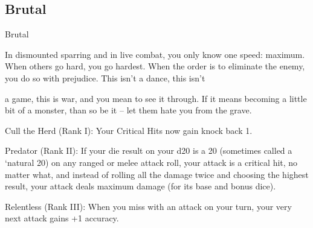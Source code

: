 \subsection{Brutal}

                                                      Brutal

In dismounted sparring and in live combat, you only know one speed: maximum. When others go hard, you
go hardest. When the order is to eliminate the enemy, you do so with prejudice. This isn’t a dance, this isn’t

a game, this is war, and you mean to see it through. If it means becoming a little bit of a monster, than so
be it -- let them hate you from the grave.




Cull the Herd (Rank I): Your Critical Hits now gain knock back 1.

Predator (Rank II): If your die result on your d20 is a 20 (sometimes called a ‘natural 20) on any
ranged or melee attack roll, your attack is a critical hit, no matter what, and instead of rolling all
the damage twice and choosing the highest result, your attack deals maximum damage (for its
base and bonus dice).

Relentless (Rank III): When you miss with an attack on your turn, your very next attack gains +1
accuracy.